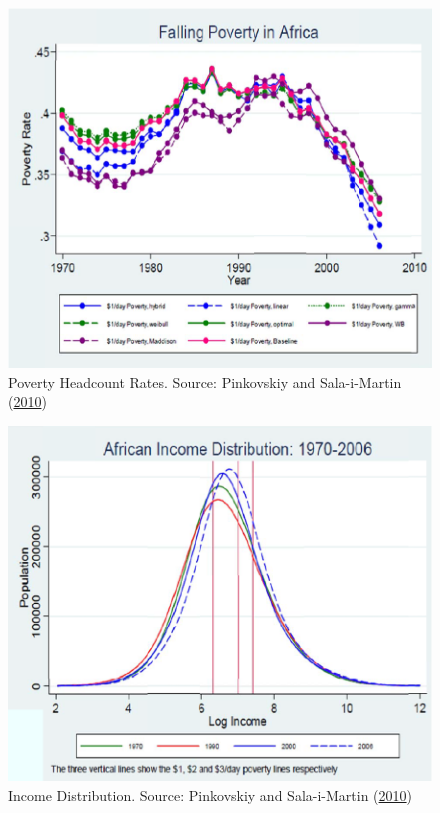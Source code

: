 \documentclass[
  a4paper,
  DIV=11,
  numbers=noendperiod]{scrartcl}
\begin{document}
\begin{figure}

{\centering \includegraphics{figures/figure-4.png}

}

\caption{\label{fig-figure-4}Poverty Headcount Rates. Source: Pinkovskiy
and Sala-i-Martin (\protect\hyperlink{ref-pinkovskiy2010}{2010})}

\end{figure}

\begin{figure}

{\centering \includegraphics{figures/figure-5.png}

}

\caption{\label{fig-figure-5}Income Distribution. Source: Pinkovskiy and
Sala-i-Martin (\protect\hyperlink{ref-pinkovskiy2010}{2010})}

\end{figure}
\end{document}
